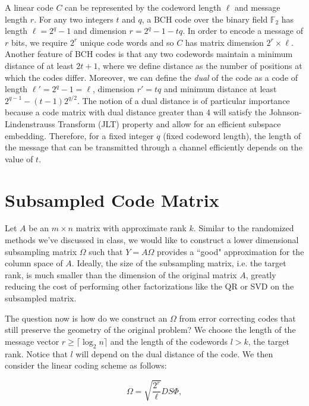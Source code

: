 \documentclass[12pt]{article}
\newcommand{\ti}{\textit}
\newcommand{\mB}{\mathbb}
\begin{document}
A linear code $C$ can be represented by the codeword length $\ell$ and message length $r$.  For any two integers $t$ and $q$, a BCH code over the binary field $\mB{F}_2$ has length $\ell = 2^q - 1$ and dimension $r = 2^q - 1 - tq$. In order to encode a message of $r$ bits, we require $2^r$ unique code words and so $C$ has matrix dimension $2^r \times \ell$. Another feature of BCH codes is that any two codewords maintain a minimum distance of at least $2t + 1$, where we define distance as the number of positions at which the codes differ. Moreover, we can define the \ti{dual} of the code as a code of length $\ell' = 2^q - 1 = \ell$, dimension $r' = tq$ and minimum distance at least $2^{q-1} - (t -1)2^{q/2}$. The notion of a dual distance is of particular importance because a code matrix with dual distance greater than 4 will satisfy the Johnson-Lindenstrauss Transform (JLT) property and allow for an efficient subspace embedding. Therefore, for a fixed integer $q$ (fixed codeword length), the length of the message that can be transmitted through a channel efficiently depends on the value of $t$.

\section{Subsampled Code Matrix}
Let $A$ be an $m \times n$ matrix with approximate rank $k$. Similar to the randomized methods we've discussed in class, we would like to construct a lower dimensional subsampling matrix  $\Omega$ such that $Y = A \Omega $ provides a ``good" approximation for the column space of $A$. Ideally, the size of the subsampling matrix, i.e. the target rank, is much smaller than the dimension of the original matrix $A$, greatly reducing the cost of performing other factorizations like the QR or SVD on the subsampled matrix.

\vspace{3mm}
The question now is how do we construct an $\Omega$ from error correcting codes  that still preserve the geometry of the original problem? We choose the length of the message vector $r \ge \lceil{\log_2n\rceil}$ and the length of the codewords $l > k$, the target rank. Notice that $l$ will depend on the dual distance of the code. We then consider the linear coding scheme as follows: 

\[ \Omega = \sqrt{ \frac{ 2^r }{ \ell } } D S \Phi, \] 
\end{document}
